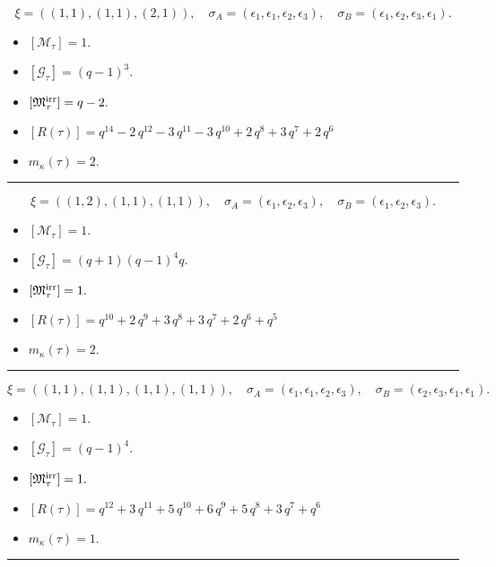 \documentclass[10pt,a4paper]{amsart}
\begin{document}
$$\xi = ({(1, 1), (1, 1), (2, 1)}),\quad \sigma_A = ({{\epsilon_1}, {\epsilon_1}, {\epsilon_2, \epsilon_3}}),\quad \sigma_B = ({{\epsilon_1}, {\epsilon_2}, {\epsilon_3, \epsilon_1}}).$$

\begin{itemize}
 \item $[\mathcal{M}_{\tau}] = 1 .$

 \item $[\mathcal{G}_{\tau}] = {\left(q - 1\right)}^{3} .$

 \item $[{\frak M}_{\tau}^{\textrm{irr}}] = q - 2 .$

 \item $[R(\tau)] = q^{14} - 2 \, q^{12} - 3 \, q^{11} - 3 \, q^{10} + 2 \, q^{8} + 3 \, q^{7} + 2 \, q^{6} $

 \item $m_{\kappa}(\tau) = 2 .$

 \end{itemize}
\noindent\rule{8cm}{0.4pt}

$$\xi = ({(1, 2), (1, 1), (1, 1)}),\quad \sigma_A = ({{\epsilon_1}, {\epsilon_2}, {\epsilon_3}}),\quad \sigma_B = ({{\epsilon_1}, {\epsilon_2}, {\epsilon_3}}).$$

\begin{itemize}
 \item $[\mathcal{M}_{\tau}] = 1 .$

 \item $[\mathcal{G}_{\tau}] = {\left(q + 1\right)} {\left(q - 1\right)}^{4} q .$

 \item $[{\frak M}_{\tau}^{\textrm{irr}}] = 1 .$

 \item $[R(\tau)] = q^{10} + 2 \, q^{9} + 3 \, q^{8} + 3 \, q^{7} + 2 \, q^{6} + q^{5} $

 \item $m_{\kappa}(\tau) = 2 .$

 \end{itemize}
\noindent\rule{8cm}{0.4pt}

$$\xi = ({(1, 1), (1, 1), (1, 1), (1, 1)}),\quad \sigma_A = ({{\epsilon_1}, {\epsilon_1}, {\epsilon_2}, {\epsilon_3}}),\quad \sigma_B = ({{\epsilon_2}, {\epsilon_3}, {\epsilon_1}, {\epsilon_1}}).$$

\begin{itemize}
 \item $[\mathcal{M}_{\tau}] = 1 .$

 \item $[\mathcal{G}_{\tau}] = {\left(q - 1\right)}^{4} .$

 \item $[{\frak M}_{\tau}^{\textrm{irr}}] = 1 .$

 \item $[R(\tau)] = q^{12} + 3 \, q^{11} + 5 \, q^{10} + 6 \, q^{9} + 5 \, q^{8} + 3 \, q^{7} + q^{6} $

 \item $m_{\kappa}(\tau) = 1 .$

 \end{itemize}
\noindent\rule{8cm}{0.4pt}
\end{document}
